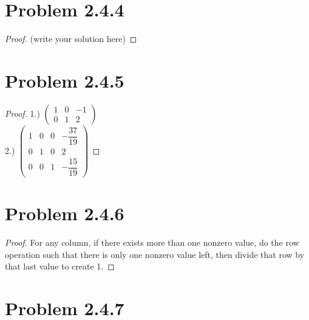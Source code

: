 \documentclass[12pt]{article}
\begin{document}
\newpage 

\section{Problem 2.4.4}

\begin{proof}
	(write your solution here)
\end{proof}

\newpage 

\section{Problem 2.4.5}

\begin{proof}
	1.)
 $\begin{pmatrix}
1 & 0 & -1\\
0 & 1 & 2
\end{pmatrix}$
\\ 2.)
$\begin{pmatrix}
1 & 0 & 0 & -\dfrac{37}{19}\\
0 & 1 & 0 & 2\\
0 & 0 & 1 & -\dfrac{15}{19}
\end{pmatrix}$
\end{proof}

\newpage 

\section{Problem 2.4.6}

\begin{proof}
	For any column, if there exists more than one nonzero value, do the row operation such that there is only one nonzero value left, then divide that row by that last value to create 1.
\end{proof}

\newpage 

\section{Problem 2.4.7}
\end{document}

